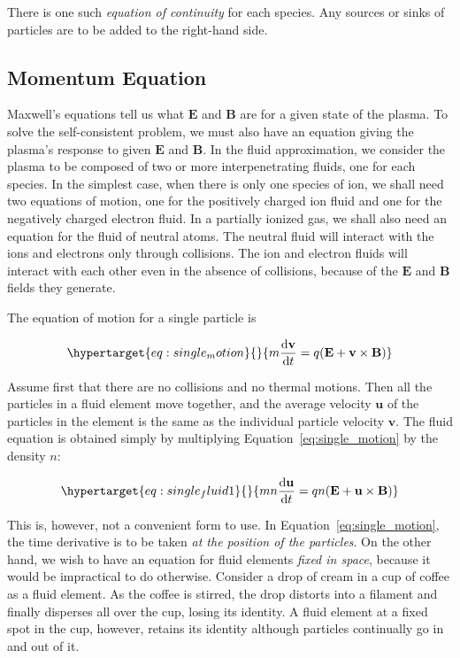 \documentclass[
  notoc %
]{tufte-book}
\begin{document}
There is one such \emph{equation of continuity} for each species. Any
sources or sinks of particles are to be added to the right-hand side.

\hypertarget{momentum-equation}{%
\subsection{Momentum Equation}\label{momentum-equation}}

Maxwell's equations tell us what \(\mathbf{E}\) and \(\mathbf{B}\) are
for a given state of the plasma. To solve the self-consistent problem,
we must also have an equation giving the plasma's response to given
\(\mathbf{E}\) and \(\mathbf{B}\). In the fluid approximation, we
consider the plasma to be composed of two or more interpenetrating
fluids, one for each species. In the simplest case, when there is only
one species of ion, we shall need two equations of motion, one for the
positively charged ion fluid and one for the negatively charged electron
fluid. In a partially ionized gas, we shall also need an equation for
the fluid of neutral atoms. The neutral fluid will interact with the
ions and electrons only through collisions. The ion and electron fluids
will interact with each other even in the absence of collisions, because
of the \(\mathbf{E}\) and \(\mathbf{B}\) fields they generate.

The equation of motion for a single particle is

\begin{equation}\protect\hypertarget{eq:single_motion}{}{
m\frac{\mathrm{d}\mathbf{v}}{\mathrm{d}t} = q(\mathbf{E}+\mathbf{v}\times\mathbf{B})
}\label{eq:single_motion}\end{equation}

Assume first that there are no collisions and no thermal motions. Then
all the particles in a fluid element move together, and the average
velocity \(\mathbf{u}\) of the particles in the element is the same as
the individual particle velocity \(\mathbf{v}\). The fluid equation is
obtained simply by multiplying Equation~\ref{eq:single_motion} by the
density \(n\):

\begin{equation}\protect\hypertarget{eq:single_fluid1}{}{
mn\frac{\mathrm{d}\mathbf{u}}{\mathrm{d}t} = qn(\mathbf{E}+\mathbf{u}\times\mathbf{B})
}\label{eq:single_fluid1}\end{equation}

This is, however, not a convenient form to use. In
Equation~\ref{eq:single_motion}, the time derivative is to be taken
\emph{at the position of the particles}. On the other hand, we wish to
have an equation for fluid elements \emph{fixed in space}, because it
would be impractical to do otherwise. Consider a drop of cream in a cup
of coffee as a fluid element. As the coffee is stirred, the drop
distorts into a filament and finally disperses all over the cup, losing
its identity. A fluid element at a fixed spot in the cup, however,
retains its identity although particles continually go in and out of it.
\end{document}

